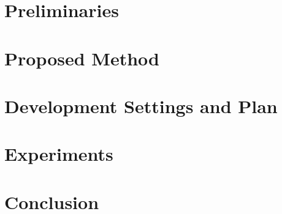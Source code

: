 \documentclass[10pt]{article}
\begin{document}
\section{Preliminaries}
\label{sec:preliminaries}


\section{Proposed Method}
\label{sec:method}


\section{Development Settings and Plan}
\label{sec:plan}


\section{Experiments}
\label{sec:experiments}


\section{Conclusion}
\label{sec:conclusion}




\end{document}
